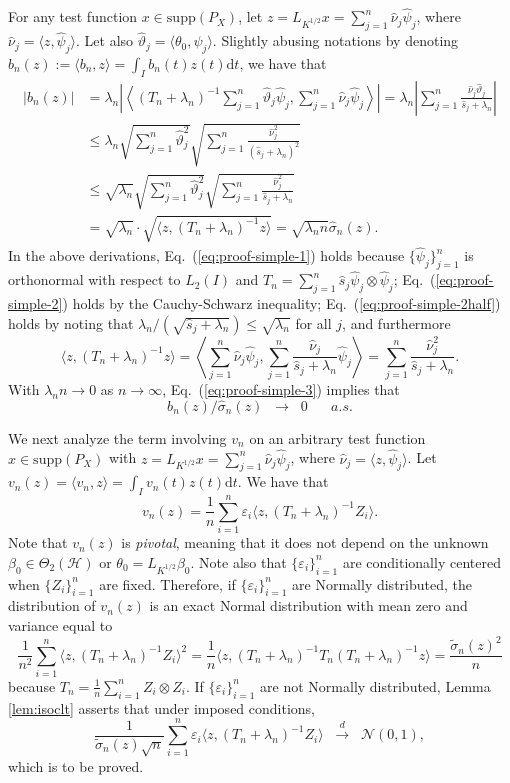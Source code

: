 \documentclass[11pt,a4paper]{article}
\renewcommand{\hat}{\widehat}
\renewcommand{\tilde}{\widetilde}
\theoremstyle{definition}
\theoremstyle{plain}
\theoremstyle{remark}
\newcommand{\supp}{\mathrm{supp}}
\newcommand{\ud}{\mathrm d}
\newcommand{\mH}{\mathcal H}
\begin{document}
For any test function $x\in\supp(P_X)$, let $z=L_{K^{1/2}}x=\sum_{j=1}^{n}\hat\nu_j\hat\psi_j$, where $\hat\nu_j=\langle z,\hat\psi_j\rangle$.
Let also $\hat\vartheta_j = \langle\theta_0,\hat\psi_j\rangle$.
Slightly abusing notations by denoting $b_n(z) := \langle b_n,z\rangle = \int_I b_n(t)z(t)\ud t$, we have that
\begin{align}
\big|b_n(z)\big| &= \lambda_n\left|\left\langle(T_n+\lambda_n)^{-1}\sum_{j=1}^n\hat\vartheta_j\hat\psi_j, \sum_{j=1}^n\hat\nu_j\hat\psi_j\right\rangle\right|
= \lambda_n \left|\sum_{j=1}^n \frac{\hat\nu_j\hat\vartheta_j}{\hat s_j+\lambda_n}\right|\label{eq:proof-simple-1}\\
&\leq \lambda_n \sqrt{\sum_{j=1}^n\hat\vartheta_j^2}\sqrt{\sum_{j=1}^n\frac{\hat\nu_j^2}{(\hat s_j+\lambda_n)^2}} \label{eq:proof-simple-2}\\
&\leq \sqrt{\lambda_n}\sqrt{\sum_{j=1}^n\hat\vartheta_j^2}\sqrt{\sum_{j=1}^n\frac{\hat\nu_j^2}{\hat s_j+\lambda_n}}\label{eq:proof-simple-2half}\\
&= \sqrt{\lambda_n}\cdot \sqrt{\langle z,(T_n+\lambda_n)^{-1}z\rangle} = \sqrt{\lambda_nn}\hat\sigma_n(z).\label{eq:proof-simple-3}
\end{align}
In the above derivations, Eq.~(\ref{eq:proof-simple-1}) holds because $\{\hat\psi_j\}_{j=1}^n$ is orthonormal with respect to $L_2(I)$ and $T_n=\sum_{j=1}^n\hat s_j\hat\psi_j\otimes\hat\psi_j$;
Eq.~(\ref{eq:proof-simple-2}) holds by the Cauchy-Schwarz inequality;
Eq.~(\ref{eq:proof-simple-2half}) holds by noting that $\lambda_n/(\sqrt{\hat s_j+\lambda_n})\leq\sqrt{\lambda_n}$ for all $j$, and furthermore
$$
\langle z, (T_n+\lambda_n)^{-1}z\rangle = \left\langle\sum_{j=1}^n\hat\nu_j\hat\psi_j, \sum_{j=1}^n\frac{\hat\nu_j}{\hat s_j+\lambda_n}\hat\psi_j\right\rangle = \sum_{j=1}^n\frac{\hat\nu_j^2}{\hat s_j+\lambda_n}.
$$
With $\lambda_n n\to 0$ as $n\to\infty$, Eq.~(\ref{eq:proof-simple-3}) implies that
$$
b_n(z)/\hat\sigma_n(z)\;\;\to\;\;0\;\;\;\;\;\;a.s.
$$

We next analyze the term involving $v_n$ on an arbitrary test function $x\in\supp(P_X)$ with $z=L_{K^{1/2}}x=\sum_{j=1}^n\hat\nu_j\hat\psi_j$, where $\hat\nu_j=\langle z,\hat\psi_j\rangle$.
Let $v_n(z)=\langle v_n,z\rangle = \int_I v_n(t)z(t)\ud t$. We have that
$$
v_n(z) = \frac{1}{n}\sum_{i=1}^n \varepsilon_i \langle z, (T_n+\lambda_n)^{-1}Z_i\rangle.
$$
Note that $v_n(z)$ is \emph{pivotal}, meaning that it does not depend on the unknown $\beta_0\in\Theta_2(\mH)$ or $\theta_0=L_{K^{1/2}}\beta_0$.
Note also that $\{\varepsilon_i\}_{i=1}^n$ are conditionally centered when $\{Z_i\}_{i=1}^n$ are fixed. Therefore, if $\{\varepsilon_i\}_{i=1}^n$ are Normally distributed,
the distribution of $v_n(z)$ is an exact Normal distribution with mean zero and variance equal to
$$
\frac{1}{n^2}\sum_{i=1}^n \langle z,(T_n+\lambda_n)^{-1}Z_i\rangle^2 = \frac{1}{n}\langle z, (T_n+\lambda_n)^{-1}T_n(T_n+\lambda_n)^{-1}z\rangle = \frac{\tilde\sigma_n(z)^2}{n}
$$
because $T_n=\frac{1}{n}\sum_{i=1}^n Z_i\otimes Z_i$. If $\{\varepsilon_i\}_{i=1}^n$ are not Normally distributed, Lemma \ref{lem:isoclt} asserts that under imposed conditions,
$$
\frac{1}{\tilde\sigma_n(z)\sqrt{n}}\sum_{i=1}^n\varepsilon_i\langle z,(T_n+\lambda_n)^{-1}Z_i\rangle\;\;\overset{d}{\to}\;\; \mathcal N(0,1),
$$
which is to be proved.
\end{document}
